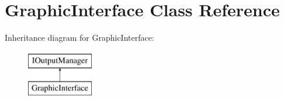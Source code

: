 \hypertarget{class_graphic_interface}{}\section{Graphic\+Interface Class Reference}
\label{class_graphic_interface}
Inheritance diagram for Graphic\+Interface\+:\begin{figure}[H]
\begin{center}
\leavevmode
\includegraphics[height=2.000000cm]{class_graphic_interface}
\end{center}
\end{figure}

